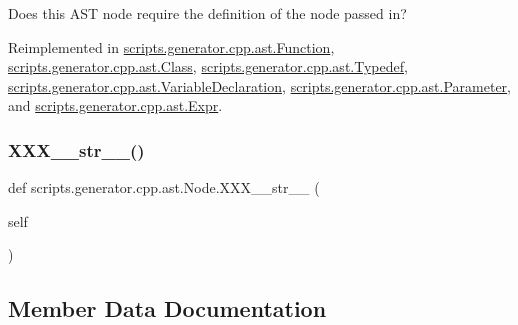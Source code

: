 \begin{DoxyVerb}Does this AST node require the definition of the node passed in?\end{DoxyVerb}
 

Reimplemented in \mbox{\hyperlink{classscripts_1_1generator_1_1cpp_1_1ast_1_1_function_ad98d013eccda376cfda87f43c37233b5}{scripts.\+generator.\+cpp.\+ast.\+Function}}, \mbox{\hyperlink{classscripts_1_1generator_1_1cpp_1_1ast_1_1_class_a5eccc02b0b7bb9c38a01cd6f50802b08}{scripts.\+generator.\+cpp.\+ast.\+Class}}, \mbox{\hyperlink{classscripts_1_1generator_1_1cpp_1_1ast_1_1_typedef_a1a243bef75ae51119bd84d6304860c48}{scripts.\+generator.\+cpp.\+ast.\+Typedef}}, \mbox{\hyperlink{classscripts_1_1generator_1_1cpp_1_1ast_1_1_variable_declaration_ab09d4cce8b643aef4b7ac1e4499c1cc2}{scripts.\+generator.\+cpp.\+ast.\+Variable\+Declaration}}, \mbox{\hyperlink{classscripts_1_1generator_1_1cpp_1_1ast_1_1_parameter_a15586f19bd17ec067ce6e6676a6244df}{scripts.\+generator.\+cpp.\+ast.\+Parameter}}, and \mbox{\hyperlink{classscripts_1_1generator_1_1cpp_1_1ast_1_1_expr_acd51c2bd5d71002925fcdc763670b80d}{scripts.\+generator.\+cpp.\+ast.\+Expr}}.

\mbox{\label{classscripts_1_1generator_1_1cpp_1_1ast_1_1_node_a67044d136ea23484bddd6d3161f5474e}} 
\subsubsection{\texorpdfstring{XXX\_\_str\_\_()}{XXX\_\_str\_\_()}}
{\footnotesize\ttfamily def scripts.\+generator.\+cpp.\+ast.\+Node.\+X\+X\+X\+\_\+\+\_\+str\+\_\+\+\_\+ (\begin{DoxyParamCaption}\item[{}]{self }\end{DoxyParamCaption})}



\subsection{Member Data Documentation}
\mbox{\label{classscripts_1_1generator_1_1cpp_1_1ast_1_1_node_a8e3394f9dd405352610ff9be4f284e2c}} 
